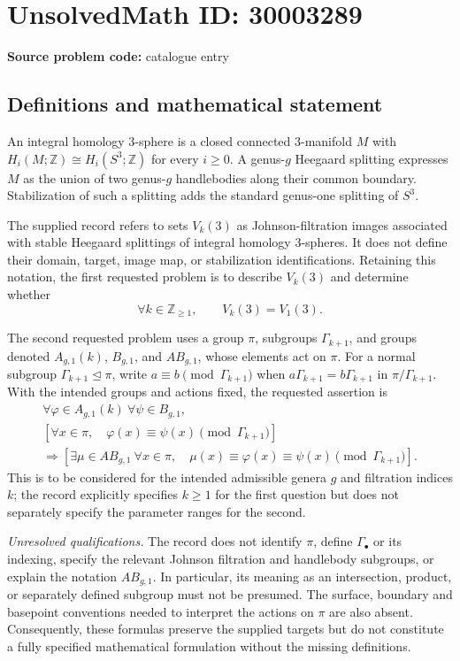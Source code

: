 \documentclass[11pt]{article}
\newcommand{\Z}{\mathbb{Z}}
\begin{document}
\section*{UnsolvedMath ID: 30003289}
\textbf{Source problem code:} catalogue entry
\subsection{Definitions and mathematical statement}
An integral homology \(3\)-sphere is a closed connected \(3\)-manifold \(M\) with \(H_i(M;\Z)\cong H_i(S^3;\Z)\) for every \(i\geq0\). A genus-\(g\) Heegaard splitting expresses \(M\) as the union of two genus-\(g\) handlebodies along their common boundary. Stabilization of such a splitting adds the standard genus-one splitting of \(S^3\).

The supplied record refers to sets \(V_k(3)\) as Johnson-filtration images associated with stable Heegaard splittings of integral homology \(3\)-spheres. It does not define their domain, target, image map, or stabilization identifications. Retaining this notation, the first requested problem is to describe \(V_k(3)\) and determine whether
\[
\forall k\in\Z_{\geq1},\qquad V_k(3)=V_1(3).
\]

The second requested problem uses a group \(\pi\), subgroups \(\Gamma_{k+1}\), and groups denoted \(A_{g,1}(k)\), \(B_{g,1}\), and \(AB_{g,1}\), whose elements act on \(\pi\). For a normal subgroup \(\Gamma_{k+1}\trianglelefteq\pi\), write \(a\equiv b\pmod{\Gamma_{k+1}}\) when \(a\Gamma_{k+1}=b\Gamma_{k+1}\) in \(\pi/\Gamma_{k+1}\). With the intended groups and actions fixed, the requested assertion is
\[
\begin{gathered}
\forall\varphi\in A_{g,1}(k)\ \forall\psi\in B_{g,1},\\
\left[\forall x\in\pi,\quad
\varphi(x)\equiv\psi(x)\pmod{\Gamma_{k+1}}\right]\\
\Longrightarrow
\left[\exists\mu\in AB_{g,1}\ \forall x\in\pi,\quad
\mu(x)\equiv\varphi(x)\equiv\psi(x)\pmod{\Gamma_{k+1}}\right].
\end{gathered}
\]
This is to be considered for the intended admissible genera \(g\) and filtration indices \(k\); the record explicitly specifies \(k\geq1\) for the first question but does not separately specify the parameter ranges for the second.

\emph{Unresolved qualifications.} The record does not identify \(\pi\), define \(\Gamma_\bullet\) or its indexing, specify the relevant Johnson filtration and handlebody subgroups, or explain the notation \(AB_{g,1}\). In particular, its meaning as an intersection, product, or separately defined subgroup must not be presumed. The surface, boundary and basepoint conventions needed to interpret the actions on \(\pi\) are also absent. Consequently, these formulas preserve the supplied targets but do not constitute a fully specified mathematical formulation without the missing definitions.
\end{document}
